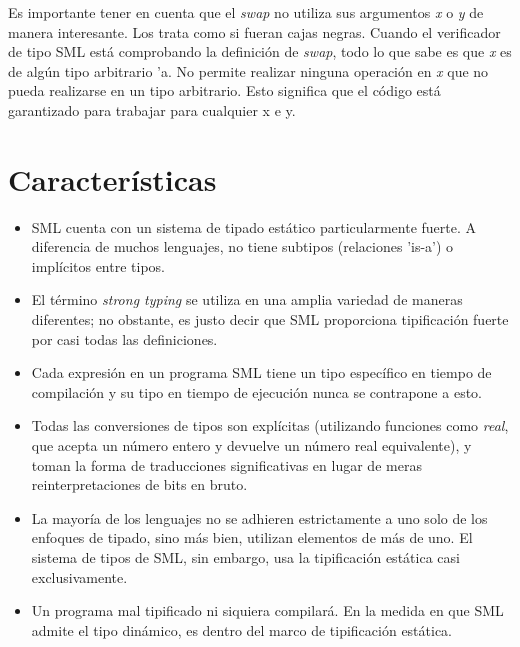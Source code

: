 \documentclass[10pt,journal,compsoc]{IEEEtran}
\begin{document}
Es importante tener en cuenta que el \textit{swap} no utiliza sus argumentos \textit{x} o \textit{y} de manera interesante. Los trata como si fueran cajas negras. Cuando el verificador de tipo SML est\'a comprobando la definici\'on de \textit{swap}, todo lo que sabe es que \textit{x} es de alg\'un tipo arbitrario 'a. No permite realizar ninguna operaci\'on en \textit{x} que no pueda realizarse en un tipo arbitrario. Esto significa que el c\'odigo est\'a garantizado para trabajar para cualquier x e y.

\section{Caracter\'isticas}
\begin{itemize}
\item SML cuenta con un sistema de tipado est\'atico particularmente fuerte. A diferencia de muchos lenguajes, no tiene subtipos (relaciones 'is-a') o impl\'icitos entre tipos.

\item El t\'ermino \textit{strong typing} se utiliza en una amplia variedad de maneras diferentes; no obstante, es justo decir que SML proporciona tipificaci\'on fuerte por casi todas las definiciones. 

\item Cada expresi\'on en un programa SML tiene un tipo espec\'ifico en tiempo de compilaci\'on y su tipo en tiempo de ejecuci\'on nunca se contrapone a esto.

\item Todas las conversiones de tipos son expl\'icitas (utilizando funciones como \textit{real}, que acepta un n\'umero entero y devuelve un n\'umero real equivalente), y toman la forma de traducciones significativas en lugar de meras reinterpretaciones de bits en bruto.

\item La mayor\'ia de los lenguajes no se adhieren estrictamente a uno solo de los enfoques de tipado, sino m\'as bien, utilizan elementos de m\'as de uno. El sistema de tipos de SML, sin embargo, usa la tipificaci\'on est\'atica casi exclusivamente. 

\item Un programa mal tipificado ni siquiera compilar\'a. En la medida en que SML admite el tipo din\'amico, es dentro del marco de tipificaci\'on est\'atica.
\end{itemize}
\end{document}
